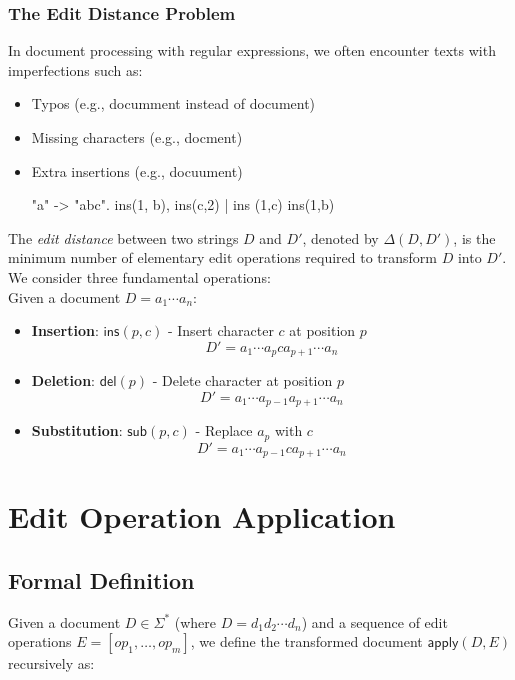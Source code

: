 \documentclass{article}
\begin{document}
\subsubsection{The Edit Distance Problem}
In document processing with regular expressions, we often encounter texts with imperfections such as:
\begin{itemize}
    \item Typos (e.g., documment instead of document)
    \item Missing characters (e.g., docment)
    \item Extra insertions (e.g., docuument)


    "a" -> "abc".  ins(1, b), ins(c,2) | ins (1,c) ins(1,b)


\end{itemize}

The \emph{edit distance} between two strings $D$ and $D'$, denoted by $\Delta(D,D')$, is the minimum number of elementary edit operations required to transform $D$ into $D'$. We consider three fundamental operations:\\

Given a document $D = a_1 \cdots a_n$:
\begin{center}
\begin{itemize}
    \item \textbf{Insertion}: $\mathsf{ins}(p,c)$ - Insert character $c$ at position $p$
    \[ D' = a_1 \cdots a_p c a_{p+1} \cdots a_n \]
    \item \textbf{Deletion}: $\mathsf{del}(p)$ - Delete character at position $p$
    \[ D' = a_1 \cdots a_{p-1} a_{p+1} \cdots a_n \]
    \item \textbf{Substitution}: $\mathsf{sub}(p,c)$ - Replace $a_p$ with $c$
    \[ D' = a_1 \cdots a_{p-1} c a_{p+1} \cdots a_n \]
\end{itemize}
\end{center}


\section{Edit Operation Application}
\label{sec:edit-application}

\subsection{Formal Definition}

Given a document $D \in \Sigma^*$ (where $D = d_1d_2\cdots d_n$) and a sequence of edit operations $E = [op_1, \ldots, op_m]$, we define the transformed document $\mathsf{apply}(D, E)$ recursively as:
\end{document}
